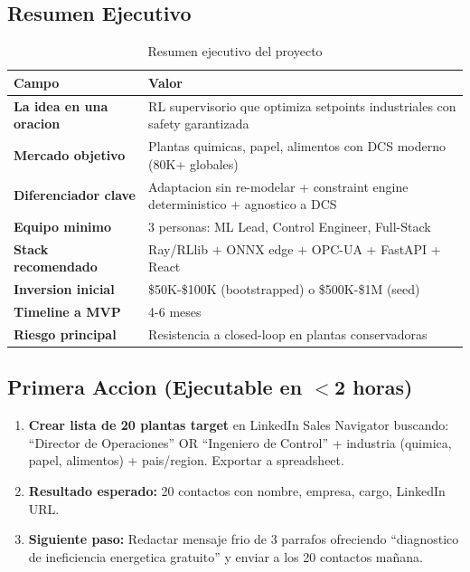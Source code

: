 \documentclass[11pt,a4paper]{article}
\begin{document}
\subsection{Resumen Ejecutivo}

\begin{table}[h]
\centering
\begin{tabular}{>{\bfseries}p{4cm} p{9cm}}
\toprule
Campo & Valor \\
\midrule
La idea en una oracion & RL supervisorio que optimiza setpoints industriales con safety garantizada \\
Mercado objetivo & Plantas quimicas, papel, alimentos con DCS moderno (80K+ globales) \\
Diferenciador clave & Adaptacion sin re-modelar + constraint engine deterministico + agnostico a DCS \\
Equipo minimo & 3 personas: ML Lead, Control Engineer, Full-Stack \\
Stack recomendado & Ray/RLlib + ONNX edge + OPC-UA + FastAPI + React \\
Inversion inicial & \$50K-\$100K (bootstrapped) o \$500K-\$1M (seed) \\
Timeline a MVP & 4-6 meses \\
Riesgo principal & Resistencia a closed-loop en plantas conservadoras \\
\bottomrule
\end{tabular}
\caption{Resumen ejecutivo del proyecto}
\end{table}

\subsection{Primera Accion (Ejecutable en $<$2 horas)}

\begin{alertabox}
\begin{enumerate}[leftmargin=*]
    \item \textbf{Crear lista de 20 plantas target} en LinkedIn Sales Navigator buscando: ``Director de Operaciones'' OR ``Ingeniero de Control'' + industria (quimica, papel, alimentos) + pais/region. Exportar a spreadsheet.
    
    \item \textbf{Resultado esperado:} 20 contactos con nombre, empresa, cargo, LinkedIn URL.
    
    \item \textbf{Siguiente paso:} Redactar mensaje frio de 3 parrafos ofreciendo ``diagnostico de ineficiencia energetica gratuito'' y enviar a los 20 contactos mañana.
\end{enumerate}
\end{alertabox}
\end{document}
